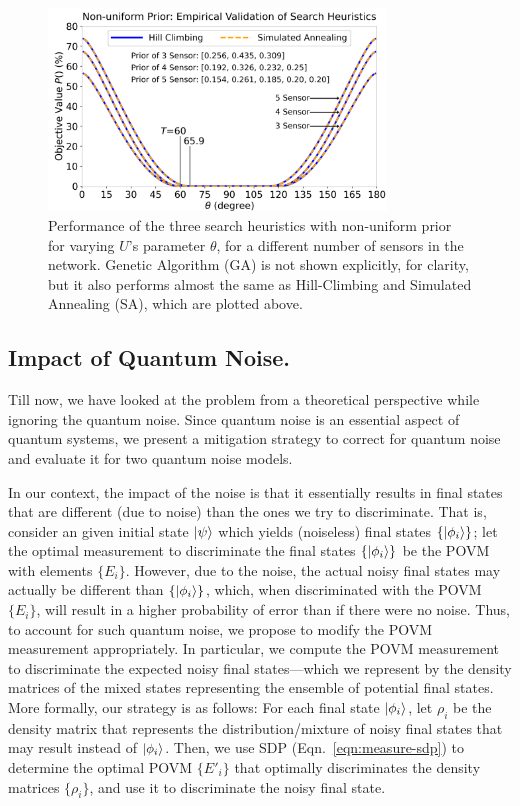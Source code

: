 \begin{figure}[t]
    \centering
    \includegraphics[width=0.8\textwidth]{chapters/tqc/figures/varying_theta_nonequal_prior.png}
    \caption{Performance of the three search heuristics with non-uniform prior for varying $U$'s parameter $\theta$, 
             for a different number of sensors in the network. Genetic Algorithm (GA) is not shown explicitly, for clarity, 
             but it also performs almost the same as Hill-Climbing and Simulated Annealing (SA), which are plotted above.}
    \label{fig:non-uniform-heuristics}
\end{figure}

\subsection{Impact of Quantum Noise.}
\label{subsec:affect_noise}
Till now, we have looked at the \iso problem from a theoretical perspective while ignoring the quantum noise. 
Since quantum noise is an essential aspect of quantum systems, we present a mitigation strategy to correct for quantum noise and evaluate it for two quantum noise models.


In our context, the impact of the noise is that it essentially results in final states that are different (due to noise) than the ones we try to discriminate. 
That is, 
consider an given initial state $\ket{\psi}$ which yields (noiseless) final states $\{ \ket{\phi_i}\}$; let the optimal measurement to discriminate the final states $\{ \ket{\phi_i}\}$ be the POVM with elements $\{ E_i\}$.
However, due to the noise, the actual noisy final states may actually be different than $\{ \ket{\phi_i}\}$, which, when discriminated with the POVM $\{ E_i\}$, will result
in a higher probability of error than if there were no noise.
Thus, to account for such quantum noise, we propose to modify the POVM measurement appropriately. In particular, we compute the POVM measurement to discriminate 
the expected noisy final states---which we represent by the density matrices of the 
mixed states representing the ensemble of potential final states. 
More formally, our strategy is as follows: For each final state $\ket{\phi_i}$, let $\rho_i$ be the density matrix that represents the distribution/mixture of noisy final states that may
result instead of $\ket{\phi_i}$. 
Then, we use SDP (Eqn.~\ref{eqn:measure-sdp}) to determine the optimal POVM $\{ E'_i\}$ that optimally discriminates the density matrices $\{\rho_i\}$, 
and use it to discriminate the noisy final state.

